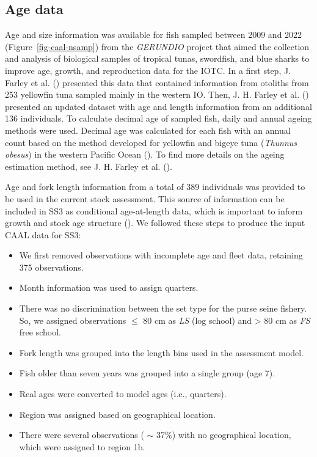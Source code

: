 \documentclass[
]{scrartcl}
\providecommand{\tightlist}{%
  \setlength{\itemsep}{0pt}\setlength{\parskip}{0pt}}\usepackage{longtable,booktabs,array}
\begin{document}
\subsection{Age data}\label{age-data}

Age and size information was available for fish sampled between 2009 and
2022 (Figure~\ref{fig-caal-nsamp}) from the \emph{GERUNDIO} project that
aimed the collection and analysis of biological samples of tropical
tunas, swordfish, and blue sharks to improve age, growth, and
reproduction data for the IOTC. In a first step, J. Farley et al.
() presented this data
that contained information from otoliths from 253 yellowfin tuna sampled
mainly in the western IO. Then, J. H. Farley et al.
() presented an
updated dataset with age and length information from an additional 136
individuals. To calculate decimal age of sampled fish, daily and annual
ageing methods were used. Decimal age was calculated for each fish with
an annual count based on the method developed for yellowfin and bigeye
tuna (\emph{Thunnus obesus}) in the western Pacific Ocean
(). To
find more details on the ageing estimation method, see J. H. Farley et
al. ().

Age and fork length information from a total of 389 individuals was
provided to be used in the current stock assessment. This source of
information can be included in SS3 as conditional age-at-length data,
which is important to inform growth and stock age structure
(). We followed
these steps to produce the input CAAL data for SS3:

\begin{itemize}
\tightlist
\item
  We first removed observations with incomplete age and fleet data,
  retaining 375 observations.
\item
  Month information was used to assign quarters.
\item
  There was no discrimination between the set type for the purse seine
  fishery. So, we assigned observations \(\leq\) 80 cm as \emph{LS} (log
  school) and \textgreater{} 80 cm as \emph{FS} free school.
\item
  Fork length was grouped into the length bins used in the assessment
  model.
\item
  Fish older than seven years was grouped into a single group (age 7).
\item
  Real ages were converted to model ages (i.e., quarters).
\item
  Region was assigned based on geographical location.
\item
  There were several observations ( \(\sim\) 37\%) with no geographical
  location, which were assigned to region 1b.
\end{itemize}
\end{document}
